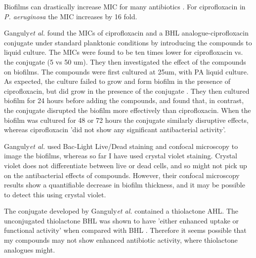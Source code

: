 %

Biofilms can drastically increase MIC for many antibiotics \cite{Ceri1999}. For ciprofloxacin in \textit{P. aeruginosa} the MIC increases by 16 fold. 

Ganguly\textit{et al.} \cite{Ganguly2011} found the MICs of ciprofloxacin and a BHL analogue-ciprofloxacin  conjugate under standard planktonic conditions by introducing the compounds to liquid culture. The MICs were found to be ten times lower for ciprofloxacin vs. the conjugate  (5 vs 50 um). They then investigated the effect of the compounds on biofilms. The compounds were first cultured at 25um, with PA liquid culture. As expected, the culture failed to grow and form biofilm in the presence of ciprofloxacin, but did grow in the presence of the conjugate . They then cultured biofilm for 24 hours before adding the compounds, and found that, in contrast, the conjugate  disrupted the biofilm more effectively than ciprofloxacin. When the biofilm was cultured for 48 or 72 hours the conjugate similarly disruptive effects, whereas ciprofloxacin 'did not show any significant antibacterial activity'.

Ganguly\textit{et al.} used Bac-Light Live/Dead staining and confocal microscopy to image the biofilms, whereas so far I have used crystal violet staining. Crystal violet does not differentiate between live or dead cells, and so might not pick up on the antibacterial effects of compounds. However, their confocal microscopy results show a quantifiable decrease in biofilm thickness, and it may be possible to detect this using crystal violet.

The conjugate  developed by Ganguly\textit{et al.} contained a thiolactone AHL. The unconjugated thiolactone BHL  was shown to have 'either enhanced uptake or functional activity' when compared with BHL . Therefore it seems possible that my compounds may not show enhanced antibiotic activity, where thiolactone analogues might.